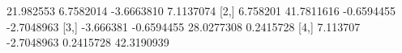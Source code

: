 \begin{Schunk}
\begin{Soutput}
          [,1]       [,2]       [,3]       [,4]
[1,] 21.982553  6.7582014 -3.6663810  7.1137074
[2,]  6.758201 41.7811616 -0.6594455 -2.7048963
[3,] -3.666381 -0.6594455 28.0277308  0.2415728
[4,]  7.113707 -2.7048963  0.2415728 42.3190939
\end{Soutput}
\end{Schunk}
